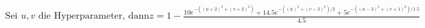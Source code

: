 \documentclass[preview]{standalone}
\begin{document}
\begin{align*}
\text{Sei }u,v\text{ die Hyperparameter, dann} z = 1 - \frac{10e^{-((u+2)^2+(v+2)^2)} + 14.5e^{-((u)^2+(v-3)^2)/2} + 5e^{-((u-3)^2+(v+1)^2)/1.5}}{4.5}
\end{align*}
\end{document}
